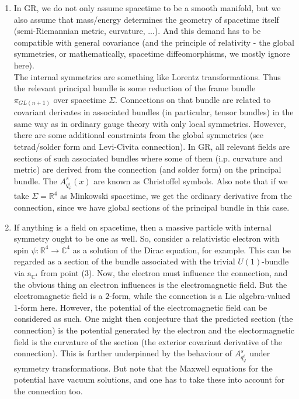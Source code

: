 \begin{enumerate}
\begin{enumerate}
\item[$\bullet$]
In GR, we do not only assume spacetime to be a smooth manifold, but we also assume that mass/energy determines the geometry of spacetime itself (semi-Riemannian metric, curvature, ...).
And this demand has to be compatible with general covariance (and the principle of relativity - the global symmetries, or mathematically, spacetime diffeomorphisms, we mostly ignore here).
\\
The internal symmetries are something like Lorentz transformations.
Thus the relevant principal bundle is some reduction of the frame bundle $\pi_{GL(n+1)}$ over spacetime $\Sigma$.
Connections on that bundle are related to covariant derivates in associated bundles (in particular, tensor bundles) in the same way as in ordinary gauge theory with only local symmetries.
However, there are some additional constraints from the global symmetries (see tetrad/solder form and Levi-Civita connection).
In GR, all relevant fields are sections of such associated bundles where some of them (i.p. curvature and metric) are derived from the connection (and solder form) on the principal bundle.
The $A_{q_{\varphi}^{i}}^{s}(x)$ are known as Christoffel symbols.
Also note that if we take $\Sigma = \mathbb{R}^{4}$ as Minkowski spacetime, we get the ordinary derivative from the connection, since we have global sections of the principal bundle in this case.
\item[$\bullet$]
If anything is a field on spacetime, then a massive particle with internal symmetry ought to be one as well.
So, consider a relativistic electron with spin $\psi \colon \mathbb{R}^{4} \rightarrow \mathbb{C}^{4}$ as a solution of the Dirac equation, for example.
This can be regarded as a section of the bundle associated with the trivial $U(1)$-bundle via $\mathrm{a}_{\mathbb{C}^{4}}$ from point (3).
Now, the electron must influence the connection, and the obvious thing an electron influences is the electromagnetic field.
But the electromagnetic field is a $2$-form, while the connection is a Lie algebra-valued $1$-form here.
However, the potential of the electromagnetic field can be considered as such.
One might then conjecture that the predicted section (the connection) is the potential generated by the electron and the electormagnetic field is the curvature of the section (the exterior covariant derivative of the connection).
This is further underpinned by the behaviour of $A_{q_{\varphi}^{i}}^{s}$ under symmetry transformations.
But note that the Maxwell equations for the potential have vacuum solutions, and one has to take these into account for the connection too.

\end{enumerate}
\end{enumerate}
